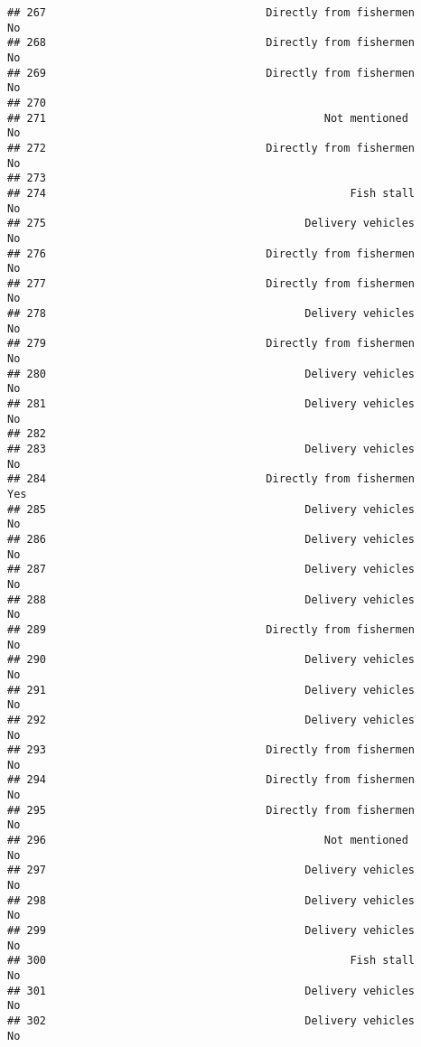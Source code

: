 \documentclass[
]{article}
\begin{document}
\begin{verbatim}
## 267                                  Directly from fishermen        No
## 268                                  Directly from fishermen        No
## 269                                  Directly from fishermen        No
## 270                                                                   
## 271                                           Not mentioned         No
## 272                                  Directly from fishermen        No
## 273                                                                   
## 274                                               Fish stall        No
## 275                                        Delivery vehicles        No
## 276                                  Directly from fishermen        No
## 277                                  Directly from fishermen        No
## 278                                        Delivery vehicles        No
## 279                                  Directly from fishermen        No
## 280                                        Delivery vehicles        No
## 281                                        Delivery vehicles        No
## 282                                                                   
## 283                                        Delivery vehicles        No
## 284                                  Directly from fishermen       Yes
## 285                                        Delivery vehicles        No
## 286                                        Delivery vehicles        No
## 287                                        Delivery vehicles        No
## 288                                        Delivery vehicles        No
## 289                                  Directly from fishermen        No
## 290                                        Delivery vehicles        No
## 291                                        Delivery vehicles        No
## 292                                        Delivery vehicles        No
## 293                                  Directly from fishermen        No
## 294                                  Directly from fishermen        No
## 295                                  Directly from fishermen        No
## 296                                           Not mentioned         No
## 297                                        Delivery vehicles        No
## 298                                        Delivery vehicles        No
## 299                                        Delivery vehicles        No
## 300                                               Fish stall        No
## 301                                        Delivery vehicles        No
## 302                                        Delivery vehicles        No

\end{verbatim}
\end{document}
